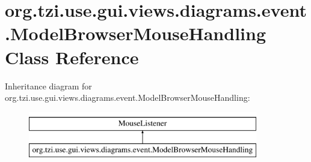\hypertarget{classorg_1_1tzi_1_1use_1_1gui_1_1views_1_1diagrams_1_1event_1_1_model_browser_mouse_handling}{\section{org.\-tzi.\-use.\-gui.\-views.\-diagrams.\-event.\-Model\-Browser\-Mouse\-Handling Class Reference}
\label{classorg_1_1tzi_1_1use_1_1gui_1_1views_1_1diagrams_1_1event_1_1_model_browser_mouse_handling}
}
Inheritance diagram for org.\-tzi.\-use.\-gui.\-views.\-diagrams.\-event.\-Model\-Browser\-Mouse\-Handling\-:\begin{figure}[H]
\begin{center}
\leavevmode
\includegraphics[height=2.000000cm]{classorg_1_1tzi_1_1use_1_1gui_1_1views_1_1diagrams_1_1event_1_1_model_browser_mouse_handling}
\end{center}
\end{figure}
